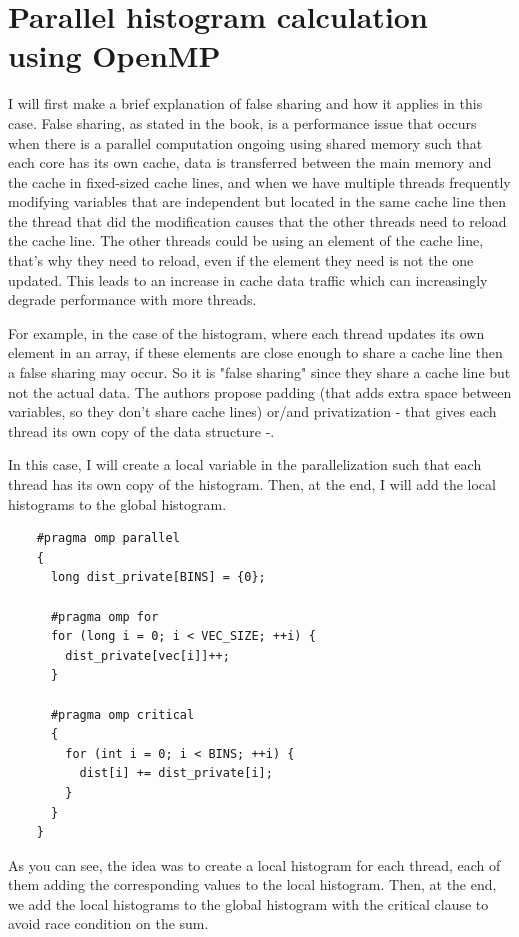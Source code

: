 \documentclass[unicode,11pt,a4paper,oneside,numbers=endperiod,openany]{scrartcl}
\begin{document}
\section{Parallel histogram calculation using OpenMP }
I will first make a brief explanation of false sharing and how it applies in this case. 
False sharing, as stated in the book, is a performance issue that occurs when there is a parallel computation 
ongoing using shared memory such that each core has its own cache, data is transferred between the main memory 
and the cache in fixed-sized cache lines, and when we have multiple threads frequently modifying variables that are independent 
but located in the same cache line then the thread that did the modification causes that the other threads need to reload the cache line.
The other threads could be using an element of the cache line, that's why they need to reload, even if the element they need is not the one updated. 
This leads to an increase in cache data traffic which can increasingly degrade performance with more threads. 

For example, in the case of the histogram, where each thread updates its own element in an array, if these elements are 
close enough to share a cache line then a false sharing may occur. So it is "false sharing" since they share a cache line but not
the actual data. The authors propose padding (that adds extra space between variables, so they don't share cache lines) or/and privatization - that gives each
thread its own copy of the data structure -.

In this case, I will create a local variable in the parallelization such that each thread has its own copy of the histogram. 
Then, at the end, I will add the local histograms to the global histogram.

\begin{lstlisting}
    #pragma omp parallel
    {
      long dist_private[BINS] = {0};  
  
      #pragma omp for
      for (long i = 0; i < VEC_SIZE; ++i) {
        dist_private[vec[i]]++;
      }
  
      #pragma omp critical
      {
        for (int i = 0; i < BINS; ++i) {
          dist[i] += dist_private[i];
        }
      }
    }
\end{lstlisting}

As you can see, the idea was to create a local histogram for each thread, each of them adding the
corresponding values to the local histogram. Then, at the end, we add the local histograms to the global histogram with 
the critical clause to avoid race condition on the sum. 
\end{document}
